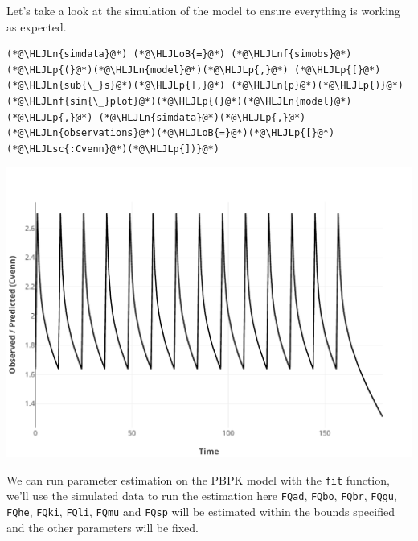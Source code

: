 \documentclass[12pt,a4paper]{article}
\newcommand{\HLJLn}[1]{#1}
\newcommand{\HLJLnf}[1]{\textcolor[RGB]{66,102,213}{#1}}
\newcommand{\HLJLsc}[1]{\textcolor[RGB]{201,61,57}{#1}}
\newcommand{\HLJLoB}[1]{\textcolor[RGB]{102,102,102}{\textbf{#1}}}
\newcommand{\HLJLp}[1]{#1}
\begin{document}
Let's take a look at the simulation of the model to ensure everything is working as expected.


\begin{lstlisting}
(*@\HLJLn{simdata}@*) (*@\HLJLoB{=}@*) (*@\HLJLnf{simobs}@*)(*@\HLJLp{(}@*)(*@\HLJLn{model}@*)(*@\HLJLp{,}@*) (*@\HLJLp{[}@*)(*@\HLJLn{sub{\_}s}@*)(*@\HLJLp{],}@*) (*@\HLJLn{p}@*)(*@\HLJLp{)}@*)
(*@\HLJLnf{sim{\_}plot}@*)(*@\HLJLp{(}@*)(*@\HLJLn{model}@*)(*@\HLJLp{,}@*) (*@\HLJLn{simdata}@*)(*@\HLJLp{,}@*) (*@\HLJLn{observations}@*)(*@\HLJLoB{=}@*)(*@\HLJLp{[}@*)(*@\HLJLsc{:Cvenn}@*)(*@\HLJLp{])}@*)
\end{lstlisting}

\includegraphics[width=\linewidth]{jl_s6OD6V/vorigsa_6_1.pdf}

We can run parameter estimation on the PBPK model with the \texttt{fit} function, we'll use the simulated data to run the estimation here \texttt{FQad}, \texttt{FQbo}, \texttt{FQbr}, \texttt{FQgu}, \texttt{FQhe}, \texttt{FQki}, \texttt{FQli}, \texttt{FQmu} and \texttt{FQsp} will be estimated within the bounds specified and the other parameters will be fixed.
\end{document}
